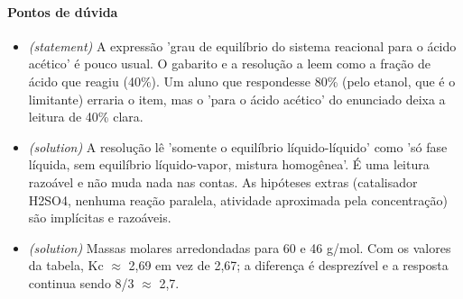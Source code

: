 \documentclass{article}%
\begin{document}
\paragraph{Pontos de dúvida}%
\begin{itemize}%
\item%
\textit{(statement)} A expressão 'grau de equilíbrio do sistema reacional para o ácido acético' é pouco usual. O gabarito e a resolução a leem como a fração de ácido que reagiu (40\%). Um aluno que respondesse 80\% (pelo etanol, que é o limitante) erraria o item, mas o 'para o ácido acético' do enunciado deixa a leitura de 40\% clara.%
\item%
\textit{(solution)} A resolução lê 'somente o equilíbrio líquido{-}líquido' como 'só fase líquida, sem equilíbrio líquido{-}vapor, mistura homogênea'. É uma leitura razoável e não muda nada nas contas. As hipóteses extras (catalisador H2SO4, nenhuma reação paralela, atividade aproximada pela concentração) são implícitas e razoáveis.%
\item%
\textit{(solution)} Massas molares arredondadas para 60 e 46 g/mol. Com os valores da tabela, Kc $\approx$ 2,69 em vez de 2,67; a diferença é desprezível e a resposta continua sendo 8/3 $\approx$ 2,7.%
\end{itemize}%
\end{document}
